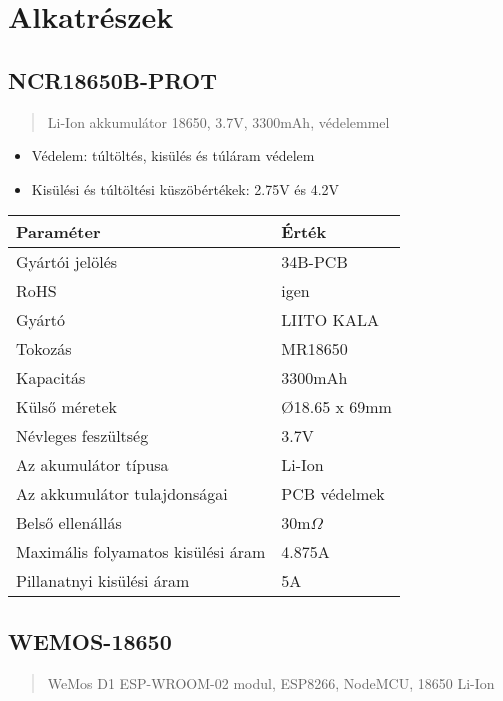 ﻿\section{Alkatrészek}

\subsection{NCR18650B-PROT}
\begin{quote}
    Li-Ion akkumulátor 18650, 3.7V, 3300mAh, védelemmel
\end{quote}

\begin{itemize}
    \item Védelem: túltöltés, kisülés és túláram védelem
    \item Kisülési és túltöltési küszöbértékek: 2.75V és 4.2V
\end{itemize}

{
    \small
    \noindent
    \begin{tabularx}{\textwidth}{@{}lX@{}}
    \toprule
    \textbf{Paraméter} & \textbf{Érték} \\
    \midrule
    Gyártói jelölés & 34B-PCB \\
    RoHS & igen \\
    Gyártó & LIITO KALA \\
    Tokozás & MR18650 \\
    Kapacitás & 3300mAh \\
    Külső méretek & Ø18.65 x 69mm \\
    Névleges feszültség & 3.7V \\
    Az akumulátor típusa & Li-Ion \\
    Az akkumulátor tulajdonságai & PCB védelmek \\
    Belső ellenállás & 30m\(\Omega\) \\
    Maximális folyamatos kisülési áram & 4.875A \\
    Pillanatnyi kisülési áram & 5A \\
    \bottomrule
    \end{tabularx}
}

\clearpage
\subsection{WEMOS-18650}
\begin{quote}
    WeMos D1 ESP-WROOM-02 modul, ESP8266, NodeMCU, 18650 Li-Ion
\end{quote}

